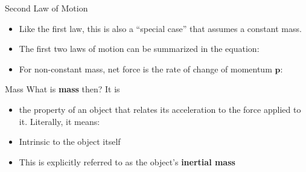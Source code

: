 \documentclass[12pt,compress,aspectratio=169]{beamer}
\begin{document}
\begin{frame}{Second Law of Motion}
  \begin{center}
  \end{center}
  \begin{itemize}
  \item\textcolor{red!80!black}{Like the first law, this is also a
    ``special case'' that assumes a constant mass.}
  \item The first two laws of motion can be summarized in the equation:

  \item For non-constant mass, net force is the rate of change of momentum
    $\bm p$:

  \end{itemize}
\end{frame}


\begin{frame}{Mass}
  What is \textbf{mass} then? It is
  \begin{itemize}
    \item the property of an object that relates its acceleration to the force
      applied to it. Literally, it means:

    \item Intrinsic to the object itself
    \item This is explicitly referred to as the object's \textbf{inertial mass}
  \end{itemize}
\end{frame}
\end{document}
